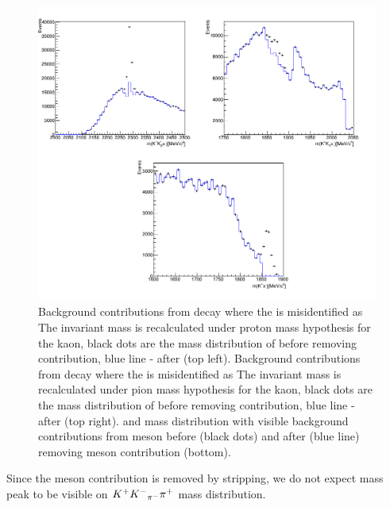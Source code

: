 \begin{figure}[h]
\includegraphics[width=14cm]{figs/Selection/Ds_vetos.png}
\centering
\caption{Background contributions from \Lc decay where the \proton is misidentified as \kaon The \Ds invariant mass is recalculated under proton mass hypothesis for the kaon, black dots are the mass distribution of \Kp\proton\pip before removing \Lc contribution, blue line - after (top left). Background contributions from \Dz decay where the \pion is misidentified as \kaon The \Ds invariant mass is recalculated under pion mass hypothesis for the kaon, black dots are the mass distribution of \Kp\pim\pip before removing \Dz contribution, blue line - after (top right). \kaon\pion and \kaon\kaon mass distribution with visible background contributions from \Dz meson before (black dots) and after (blue line) removing \Dz meson contribution (bottom).}
\label{fig:reso}
\end{figure}
 
 Since the \Dp meson contribution is removed by stripping, we do not expect \Dp mass peak to be visible on ${{K}^+}{{K}^-}_{{{\pi}^-}}{{\pi}^+}$ mass distribution. 


